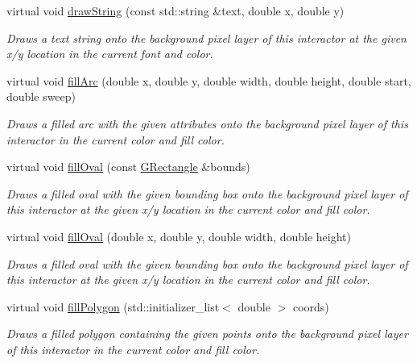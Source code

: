 \begin{DoxyCompactItemize}
virtual void \mbox{\hyperlink{classGDrawingSurface_ad4e8551a753a77135792bbee97013675}{draw\+String}} (const std\+::string \&text, double x, double y)
\begin{DoxyCompactList}\small\item\em Draws a text string onto the background pixel layer of this interactor at the given x/y location in the current font and color. \end{DoxyCompactList}\item 
virtual void \mbox{\hyperlink{classGDrawingSurface_a228075ad18bd97b57f9956568c4773f3}{fill\+Arc}} (double x, double y, double width, double height, double start, double sweep)
\begin{DoxyCompactList}\small\item\em Draws a filled arc with the given attributes onto the background pixel layer of this interactor in the current color and fill color. \end{DoxyCompactList}\item 
virtual void \mbox{\hyperlink{classGDrawingSurface_a1ea6e48d59fb588797dba4deab1397e0}{fill\+Oval}} (const \mbox{\hyperlink{classGRectangle}{G\+Rectangle}} \&bounds)
\begin{DoxyCompactList}\small\item\em Draws a filled oval with the given bounding box onto the background pixel layer of this interactor at the given x/y location in the current color and fill color. \end{DoxyCompactList}\item 
virtual void \mbox{\hyperlink{classGDrawingSurface_a28c700c82f31cd328a4629273420ee61}{fill\+Oval}} (double x, double y, double width, double height)
\begin{DoxyCompactList}\small\item\em Draws a filled oval with the given bounding box onto the background pixel layer of this interactor at the given x/y location in the current color and fill color. \end{DoxyCompactList}\item 
virtual void \mbox{\hyperlink{classGDrawingSurface_a15f8c1c4409ef51c1a30a92a195b8f66}{fill\+Polygon}} (std\+::initializer\+\_\+list$<$ double $>$ coords)
\begin{DoxyCompactList}\small\item\em Draws a filled polygon containing the given points onto the background pixel layer of this interactor in the current color and fill color. \end{DoxyCompactList}\item 

\end{DoxyCompactItemize}
